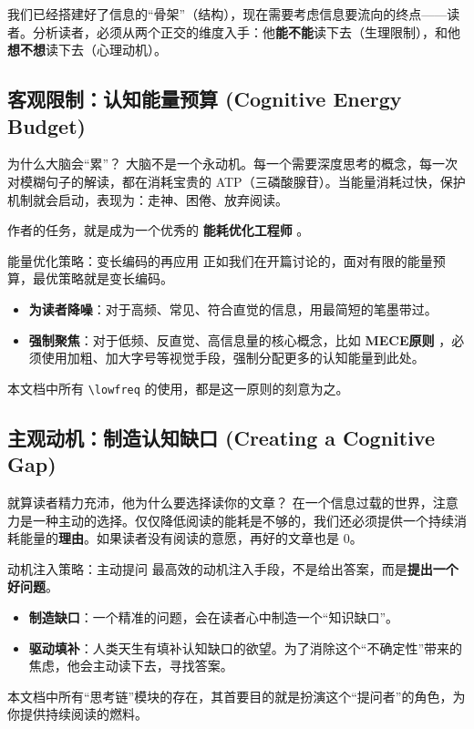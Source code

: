 \documentclass[11pt, a4paper]{ctexart}
\newcommand{\lowfreq}[1]{%
	{\Large\bfseries\color{red!60!black} #1}%
}
\begin{document}
	我们已经搭建好了信息的“骨架”（结构），现在需要考虑信息要流向的终点——读者。分析读者，必须从两个正交的维度入手：他\textbf{能不能}读下去（生理限制），和他\textbf{想不想}读下去（心理动机）。
	
	\subsection{客观限制：认知能量预算 (Cognitive Energy Budget)}
	
	\begin{thinkbox}{为什么大脑会“累”？}
		大脑不是一个永动机。每一个需要深度思考的概念，每一次对模糊句子的解读，都在消耗宝贵的 ATP（三磷酸腺苷）。当能量消耗过快，保护机制就会启动，表现为：走神、困倦、放弃阅读。
		
		作者的任务，就是成为一个优秀的\lowfreq{能耗优化工程师}。
	\end{thinkbox}
	
	\begin{strategybox}{能量优化策略：变长编码的再应用}
		正如我们在开篇讨论的，面对有限的能量预算，最优策略就是变长编码。
		\begin{itemize}
			\item \textbf{为读者降噪}：对于高频、常见、符合直觉的信息，用最简短的笔墨带过。
			\item \textbf{强制聚焦}：对于低频、反直觉、高信息量的核心概念，比如\lowfreq{MECE原则}，必须使用加粗、加大字号等视觉手段，强制分配更多的认知能量到此处。
		\end{itemize}
		本文档中所有 \texttt{\textbackslash lowfreq} 的使用，都是这一原则的刻意为之。
	\end{strategybox}
	
	\subsection{主观动机：制造认知缺口 (Creating a Cognitive Gap)}
	
	\begin{thinkbox}{就算读者精力充沛，他为什么要选择读你的文章？}
		在一个信息过载的世界，注意力是一种主动的选择。仅仅降低阅读的能耗是不够的，我们还必须提供一个持续消耗能量的\textbf{理由}。如果读者没有阅读的意愿，再好的文章也是 0。
	\end{thinkbox}
	
	\begin{strategybox}{动机注入策略：主动提问}
		最高效的动机注入手段，不是给出答案，而是\textbf{提出一个好问题}。
		\begin{itemize}
			\item \textbf{制造缺口}：一个精准的问题，会在读者心中制造一个“知识缺口”。
			\item \textbf{驱动填补}：人类天生有填补认知缺口的欲望。为了消除这个“不确定性”带来的焦虑，他会主动读下去，寻找答案。
		\end{itemize}
		本文档中所有“思考链”模块的存在，其首要目的就是扮演这个“提问者”的角色，为你提供持续阅读的燃料。
	\end{strategybox}
	
\end{document}
